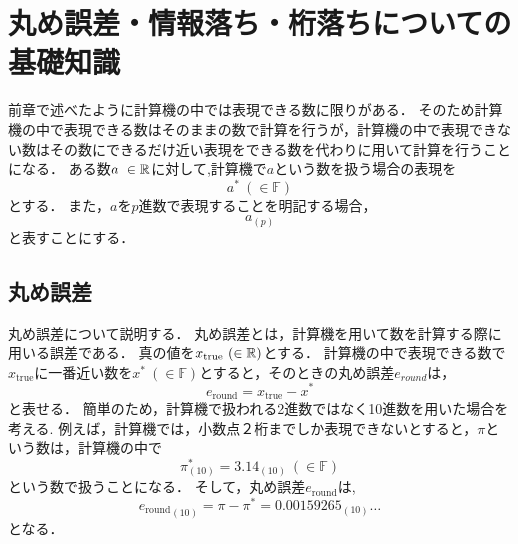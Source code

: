\chapter{丸め誤差・情報落ち・桁落ちについての基礎知識}
前章で述べたように計算機の中では表現できる数に限りがある．
そのため計算機の中で表現できる数はそのままの数で計算を行うが，計算機の中で表現できない数はその数にできるだけ近い表現をできる数を代わりに用いて計算を行うことになる．
ある数$a\ \in \mathbb{R}$に対して,計算機で$a$という数を扱う場合の表現を
\begin{equation}    
    a^{\ast} \ (\in \mathbb{F})
\end{equation}
とする．
また，$a$を$p$進数で表現することを明記する場合，
\begin{equation}
    a_{(p)}
\end{equation}
と表すことにする．
\label{chap:基礎知識2}
\section{丸め誤差}
丸め誤差について説明する．
丸め誤差とは，計算機を用いて数を計算する際に用いる誤差である．
真の値を$x_{\mathrm{true}} \ (\in \mathbb{R})$とする．
計算機の中で表現できる数で$x_{\mathrm{true}}$に一番近い数を$x^{\ast} \ (\in \mathbb{F})$とすると，そのときの丸め誤差$e_{round}$は，
\begin{equation}
    e_{\mathrm{round}} = x_{\mathrm{true}} - x^{\ast}
\end{equation}
と表せる．
簡単のため，計算機で扱われる2進数ではなく10進数を用いた場合を考える.
例えば，計算機では，小数点２桁までしか表現できないとすると，$\pi$という数は，計算機の中で
\begin{equation}
    \pi^{\ast}_{(10)} = 3.14_{(10)} \ (\in \mathbb{F})
\end{equation}
という数で扱うことになる．
そして，丸め誤差$e_{\mathrm{round}}$は,
\begin{equation}
    {e_{\mathrm{round}}}_{(10)} = \pi - \pi^{\ast} = {0.00159265_{(10)}\dots}
\end{equation}
となる．


